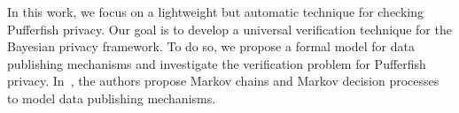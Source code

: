 
In this work, we focus on a lightweight but automatic technique for
checking Pufferfish privacy. Our goal is to develop a universal
verification technique for the Bayesian privacy framework. To do so,
we propose a formal model for data publishing mechanisms and
investigate the verification problem for Pufferfish privacy.
In~\cite{LWZ:18:MCDPP}, the authors propose Markov chains and Markov
decision processes to model data publishing mechanisms. 



